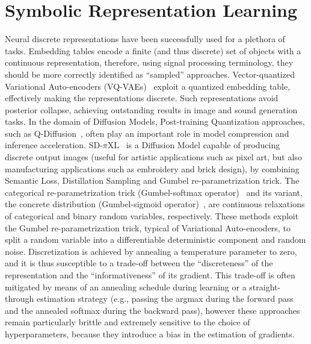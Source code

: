 

\section{Symbolic Representation Learning}\label{nesy2023:sec:related}
Neural discrete representations have been successfully used for a plethora of tasks.
%
Embedding tables encode a finite (and thus discrete) set of objects with a continuous representation, therefore, using signal processing terminology, they should be more correctly identified as ``sampled'' approaches. 
Vector-quantized Variational Auto-encoders (VQ-VAEs)~\cite{van2017neural} exploit a quantized embedding table, effectively making the representations discrete. Such representations avoid posterior collapse, achieving outstanding results in image and sound generation tasks.
In the domain of Diffusion Models, Post-training Quantization approaches, such as Q-Diffusion~\cite{li2023q}, often play an important role in model compression and inference acceleration.
SD-$\pi$XL~\cite{binninger2024sd} is a Diffusion Model capable of producing discrete output images (useful for artistic applications such as pixel art, but also manufacturing applications such as embroidery and brick design), by combining Semantic Loss, Distillation Sampling and Gumbel re-parametrization trick.
The categorical re-parametrization trick (Gumbel-softmax operator)~\cite{jang2016categorical} and its variant, the concrete distribution (Gumbel-sigmoid operator)~\cite{maddison2016concrete}, are continuous relaxations of categorical and binary random variables, respectively. These methods exploit the Gumbel re-parametrization trick, typical of Variational Auto-encoders, to split a random variable into a differentiable deterministic component and random noise.
Discretization is achieved by annealing a temperature parameter to zero, and it is thus susceptible to a trade-off between the ``discreteness'' of the representation and the ``informativeness'' of its gradient. This trade-off is often mitigated by means of an annealing schedule during learning or a straight-through estimation strategy (e.g., passing the argmax during the forward pass and the annealed softmax during the backward pass), however these approaches remain particularly brittle and extremely sensitive to the choice of hyperparameters, because they introduce a bias in the estimation of gradients.
